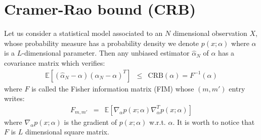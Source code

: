 \documentclass[a4paper, 12pt]{report}
\newcommand{\esp}[1]{\mathds{E}\left[ #1 \right]}
\begin{document}
 \newpage\clearpage
 \section{Cramer-Rao bound (CRB)}
Let us consider a statistical model associated to an $N$ dimensional observation $X$, whose probability measure has a probability density we denote $p(x;\alpha)$ where $\alpha$ is a $L$-dimensional parameter. Then any unbiased estimator $\hat\alpha_{N}$ of $\alpha$ has a covariance matrix which verifies:
\begin{eqnarray*}
 \esp{(\hat\alpha_{N}-\alpha) (\hat\alpha_{N}-\alpha)^{T}}&\leq& \mathrm{CRB}(\alpha) = F^{-1}(\alpha)
\end{eqnarray*}
where $F$ is called the Fisher information matrix (FIM) whose $(m,m')$ entry writes:
\begin{eqnarray*}
 F_{m,m'}&=&\esp{\nabla_{\alpha}p(x;\alpha)\nabla_{\alpha}^{T}p(x;\alpha)}
\end{eqnarray*}
where $\nabla_{\alpha}p(x;\alpha)$ is the gradient of $p(x;\alpha)$ w.r.t. $\alpha$. It is worth to notice that $F$ is $L$ dimensional square matrix.
\end{document}
